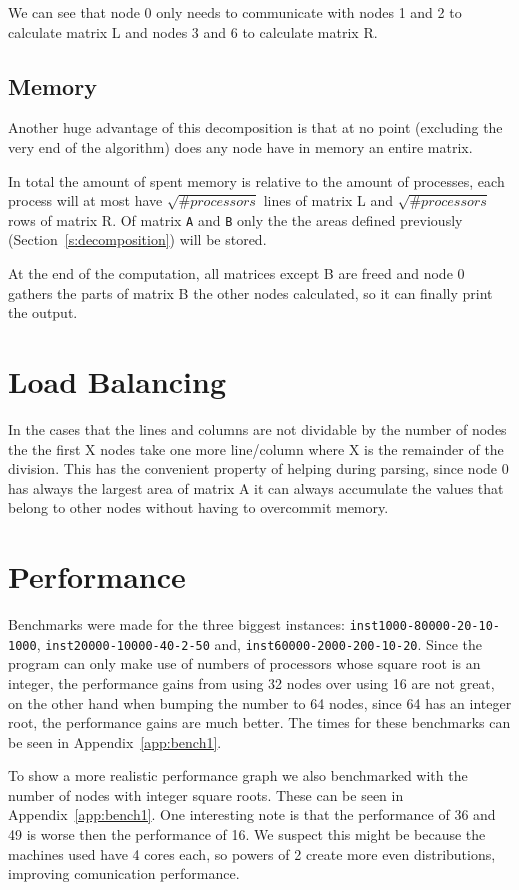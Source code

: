 \documentclass[a4paper]{article}
\begin{document}
We can see that node 0 only needs to communicate with nodes 1 and 2 to calculate
matrix L and nodes 3 and 6 to calculate matrix R.

\subsection{Memory}

Another huge advantage of this decomposition is that at no point (excluding the
very end of the algorithm) does any node have in memory an entire matrix.

In total the amount of spent memory is relative to the amount of processes, each
process will at most have $\sqrt{\#processors}$ lines of matrix L and
$\sqrt{\#processors}$ rows of matrix R. Of matrix \texttt{A} and \texttt{B} only the
the areas defined previously (Section~\ref{s:decomposition}) will be stored.

At the end of the computation, all matrices except B are freed and node 0
gathers the parts of matrix B the other nodes calculated, so it can finally print
the output.

\section{Load Balancing}
In the cases that the lines and columns are not dividable by the number of nodes
the the first X nodes take one more line/column where X is the remainder of the
division. This has the convenient property of helping during parsing, since node
0 has always the largest area of matrix A it can always accumulate the values
that belong to other nodes without having to overcommit memory.

\section{Performance}
Benchmarks were made for the three biggest instances:
\texttt{inst1000-80000-20-10-1000}, \texttt{inst20000-10000-40-2-50} and,
\texttt{inst60000-2000-200-10-20}. Since the program can only make use of
numbers of processors whose square root is an integer, the performance gains
from using 32 nodes over using 16 are not great, on the other hand when bumping
the number to 64 nodes, since 64 has an integer root, the performance gains are
much better.  The times for these benchmarks can be seen in
Appendix~\ref{app:bench1}.

To show a more realistic performance graph we also benchmarked with the number
of nodes with integer square roots. These can be seen in
Appendix~\ref{app:bench1}. One interesting note is that the performance of 36
and 49 is worse then the performance of 16. We suspect this might be because the
machines used have 4 cores each, so powers of 2 create more even distributions,
improving comunication performance.
\end{document}
